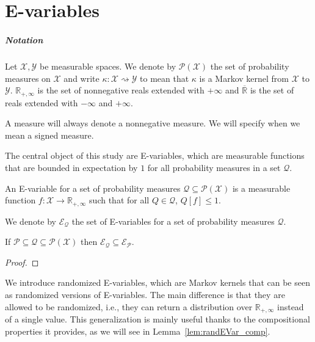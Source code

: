 \chapter{E-variables}


\paragraph{Notation}
Let $\mathcal{X}, \mathcal{Y}$ be measurable spaces.
We denote by $\mathcal{P}(\mathcal{X})$ the set of probability measures on $\mathcal{X}$ and write $\kappa : \mathcal{X} \rightsquigarrow \mathcal{Y}$ to mean that $\kappa$ is a Markov kernel from $\mathcal{X}$ to $\mathcal{Y}$.
$\mathbb{R}_{+,\infty}$ is the set of nonnegative reals extended with $+\infty$ and $\overline{\mathbb{R}}$ is the set of reals extended with $-\infty$ and $+\infty$.

A measure will always denote a nonnegative measure. We will specify when we mean a signed measure.

The central object of this study are E-variables, which are measurable functions that are bounded in expectation by $1$ for all probability measures in a set $\mathcal{Q}$.

\begin{definition}\label{def:eVar}
  \leanok
An E-variable for a set of probability measures $\mathcal{Q} \subseteq \mathcal{P}(\mathcal{X})$ is a measurable function $f : \mathcal{X} \to \mathbb{R}_{+,\infty}$ such that for all $Q \in \mathcal{Q}$, $Q[f] \le 1$.
\end{definition}

We denote by $\mathcal{E}_{\mathcal{Q}}$ the set of E-variables for a set of probability measures $\mathcal{Q}$.

\begin{lemma}\label{lem:eVarSet_anti}
  \leanok
If $\mathcal{P} \subseteq \mathcal{Q} \subseteq \mathcal{P}(\mathcal{X})$ then $\mathcal{E}_{\mathcal{Q}} \subseteq \mathcal{E}_{\mathcal{P}}$.
\end{lemma}

\begin{proof}\leanok

\end{proof}

We introduce randomized E-variables, which are Markov kernels that can be seen as randomized versions of E-variables.
The main difference is that they are allowed to be randomized, i.e., they can return a distribution over $\mathbb{R}_{+,\infty}$ instead of a single value.
This generalization is mainly useful thanks to the compositional properties it provides, as we will see in Lemma~\ref{lem:randEVar_comp}.


